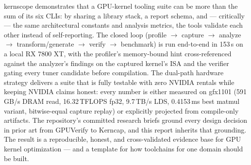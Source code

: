 \documentclass[10pt]{article}
\begin{document}
kernscope demonstrates that a GPU-kernel tooling suite can be more than the sum of its
six CLIs: by sharing a library stack, a report schema, and --- critically --- the same
architectural constants and analysis metrics, the tools validate each other instead of
self-reporting. The closed loop (profile $\rightarrow$ capture $\rightarrow$ analyze
$\rightarrow$ transform/generate $\rightarrow$ verify $\rightarrow$ benchmark) is run
end-to-end in 153\,s on a local RX 7800 XT, with the profiler's memory-bound hint
cross-referenced against the analyzer's findings on the captured kernel's ISA and the
verifier gating every tuner candidate before compilation. The dual-path hardware
strategy delivers a suite that is fully testable with zero NVIDIA rentals while keeping
NVIDIA claims honest: every number is either measured on gfx1101 (591\,GB/s DRAM read,
16.32\,TFLOPS fp32, 9.7\,TB/s LDS, 0.4153\,ms best matmul variant, bitwise-equal capture
replay) or explicitly projected from compile-only artifacts. The repository's committed
research briefs ground every design decision in prior art from GPUVerify to Kerncap, and
this report inherits that grounding. The result is a reproducible, honest, and
cross-validated evidence base for GPU kernel optimization --- and a template for how
toolchains for one domain should be built.



\end{document}
